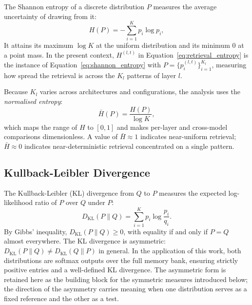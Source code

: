 The Shannon entropy of a discrete distribution $P$ \citep{shannon1948mathematical}
measures the average uncertainty of drawing from it:
\begin{equation}
    H(P) = -\sum_{i=1}^{K} p_i \log p_i,
    \label{eq:shannon_entropy}
\end{equation}
It attains its maximum $\log K$ at the uniform
distribution and its minimum $0$ at a point mass. In the present context,
$H^{(l,t)}$ in Equation~\eqref{eq:retrieval_entropy} is the instance of
Equation~\eqref{eq:shannon_entropy} with $P = \{p_i^{(l,t)}\}_{i=1}^{K_l}$,
measuring how spread the retrieval is across the $K_l$ patterns of layer $l$.

Because $K_l$ varies across architectures and configurations, the analysis uses the
\emph{normalised entropy}:
\begin{equation}
    \bar{H}(P) = \frac{H(P)}{\log K},
    \label{eq:normalised_entropy}
\end{equation}
which maps the range of $H$ to $[0,1]$ and makes per-layer and cross-model
comparisons dimensionless. A value of $\bar{H} \approx 1$ indicates near-uniform
retrieval; $\bar{H} \approx 0$ indicates near-deterministic retrieval concentrated
on a single pattern.

\subsection{Kullback-Leibler Divergence}
\label{subsec:kl_divergence}

The Kullback-Leibler (KL) divergence from $Q$ to $P$
\citep{kullback1951information} measures the expected log-likelihood ratio of $P$
over $Q$ under $P$:
\begin{equation}
    D_{\mathrm{KL}}(P \| Q) = \sum_{i=1}^{K} p_i \log \frac{p_i}{q_i}.
    \label{eq:kl_divergence}
\end{equation}
By Gibbs' inequality, $D_{\mathrm{KL}}(P \| Q) \geq 0$, with equality if and only
if $P = Q$ almost everywhere. The KL divergence is asymmetric: $D_{\mathrm{KL}}(P
\| Q) \neq D_{\mathrm{KL}}(Q \| P)$ in general. In the application of this work,
both distributions are softmax outputs over the full memory bank, ensuring strictly
positive entries and a well-defined KL divergence. The asymmetric form is retained
here as the building block for the symmetric measures introduced below; the
direction of the asymmetry carries meaning when one distribution serves as a fixed
reference and the other as a test.

